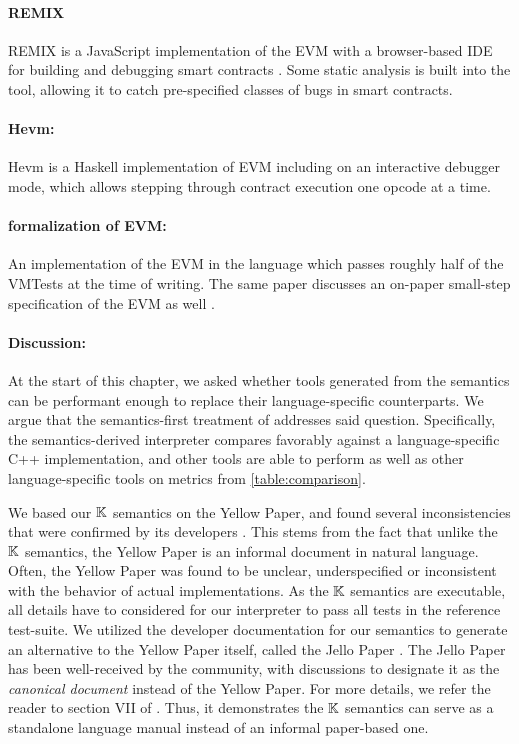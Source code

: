 \paragraph{REMIX}
REMIX is a JavaScript implementation of the EVM with a browser-based IDE for building and debugging smart contracts
\cite{RemixUrl}.
Some static analysis is built into the tool, allowing it to catch pre-specified classes of bugs in smart contracts.

\paragraph{Hevm:}
Hevm \cite{HevmUrl} is a Haskell implementation of EVM including on an interactive debugger mode, which allows stepping through contract execution one opcode at a time.

\paragraph{\Fstar{} formalization of EVM:}
An implementation of the EVM in the \Fstar{} language \cite{FstarUrl}
 which passes roughly half of the VMTests at the time of writing.
The same paper discusses an on-paper small-step specification of the EVM as well
\cite{GrishchenkoETAPS18}.

\paragraph{Discussion:}
At the start of this chapter, we asked whether tools generated from
the semantics can be performant enough to replace their language-specific
counterparts. We argue that the semantics-first treatment of
\KEVM{} addresses said question. Specifically, the
semantics-derived interpreter compares favorably against a language-specific
C++ implementation, and other tools are able to perform as well as
other language-specific tools on metrics from \autoref{table:comparison}.

We based our $\mathbb{K}$ semantics on the Yellow Paper, and
found several inconsistencies that were confirmed by its developers \cite{HildenbrandtCSF18}.
This stems from the fact that unlike the $\mathbb{K}$ semantics,
the Yellow Paper is an informal document in natural language.
Often, the Yellow Paper was found to be unclear, underspecified
or inconsistent with the behavior of actual implementations.
As the $\mathbb{K}$ semantics are executable, all details have to
considered for our interpreter to pass all tests in the reference
test-suite. We utilized the developer documentation for our semantics
to generate an alternative to the Yellow Paper itself, called the Jello Paper
\cite{EvmJellopaperUrl}. The Jello Paper has been well-received by the
community, with discussions to designate it as the \emph{canonical document}
instead of the Yellow Paper. For more details, we refer the reader to
section VII of \cite{HildenbrandtCSF18}. Thus, it demonstrates the $\mathbb{K}$ semantics
can serve as a standalone language manual instead of an informal paper-based
one.

